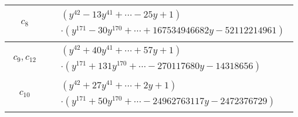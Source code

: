 \documentclass[1p]{elsarticle_modified}
\theoremstyle{definition}
\begin{document}
\begin{tabular}{m{50pt}|m{274pt}}
\hline $$\begin{aligned}c_{8}\end{aligned}$$&$\begin{aligned}
&(y^{42}-13 y^{41}+\cdots-25 y+1)\\
&\cdot(y^{171}-30 y^{170}+\cdots+167534946682 y-52112214961)
\end{aligned}$\\
\hline $$\begin{aligned}c_{9},c_{12}\end{aligned}$$&$\begin{aligned}
&(y^{42}+40 y^{41}+\cdots+57 y+1)\\
&\cdot(y^{171}+131 y^{170}+\cdots-270117680 y-14318656)
\end{aligned}$\\
\hline $$\begin{aligned}c_{10}\end{aligned}$$&$\begin{aligned}
&(y^{42}+27 y^{41}+\cdots+2 y+1)\\
&\cdot(y^{171}+50 y^{170}+\cdots-24962763117 y-2472376729)
\end{aligned}$\\
\hline
\end{tabular}
\vskip 2pc
\end{document}
